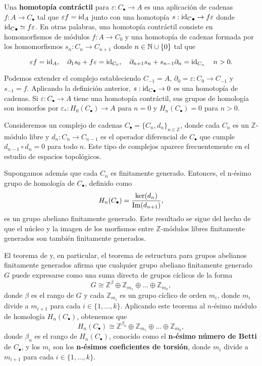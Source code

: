 \begin{definicion}
	\label{def:contr_homotopy} Una \textbf{homotopía contráctil} para
	\(\varepsilon: C_{\bullet}\to A\) es una aplicación de cadenas
	\(f: A \to C_{\bullet}\) tal que \(\varepsilon f = \operatorname{id}_{A}\) junto con una
	homotopía \(s:{\operatorname{id}_C}_{\bullet}\rightarrow f \varepsilon\) donde
	\({\operatorname{id}_C}_{\bullet}\simeq f \varepsilon\). En otras palabras, una homotopía
	contráctil consiste en homomorfismos de módulos \(f: A \to C_{0}\) y una homotopía de cadenas formada por los homomorfismos 
	\(s_{n}: C_{n}\to C_{n+1} \) donde $n \in \mathbb{N} \cup \{0\}$ tal que
	
	\[
	\varepsilon f = \operatorname{id}_{A}, \quad \partial_{1}s_{0}+ f \varepsilon = \operatorname{id}_{C_0},
	\quad \partial_{n+1}s_{n}+ s_{n-1}\partial_{n}= \operatorname{id}_{C_n}\quad n > 0.
	\]
\end{definicion}

Podemos extender el complejo estableciendo \(C_{-1}= A\), \(\partial_{0}= \varepsilon
: C_{0}\to C_{-1}\) y \(s_{-1}= f\). Aplicando la definición anterior, \(s:{\operatorname{id}_C}
_{\bullet}\rightarrow 0\) es una homotopía de cadenas. Si
\(\varepsilon: C_{\bullet}\to A\) tiene una homotopía contráctil, sus grupos de homología
son isomorfos por \(\varepsilon_{*}: H_{0}(C_{\bullet}) \rightarrow A\) para \(n = 0\)
y \(H_{n}(C_{\bullet}) = 0\) para \(n > 0\).

Consideremos un complejo de cadenas \(C_{\bullet}= \{ C_{n}, d_{n}\}_{n \in
	\mathbb{Z}}\), donde cada \(C_{n}\) es un \(\mathbb{Z}\)-módulo libre y
\(d_{n}: C_{n}\to C_{n-1}\) es el operador diferencial de \(C_{\bullet}\) que cumple
\(d_{n-1}\circ d_{n}= 0\) para todo \(n\). Este tipo de complejos aparece frecuentemente
en el estudio de espacios topológicos.

Supongamos además que cada \(C_{n}\) es finitamente generado. Entonces, el n-ésimo
grupo de homología de \(C_{\bullet}\), definido como
\[
H_{n}(C_{\bullet}) = \frac{\ker(d_{n})}{\operatorname{Im}(d_{n+1})},
\]
es un grupo abeliano finitamente generado. Este resultado se sigue del hecho de que
el núcleo y la imagen de los morfismos entre \(\mathbb{Z}\)-módulos libres finitamente
generados son también finitamente generados.

El teorema de  y, en particular, el teorema de
estructura para grupos abelianos finitamente generados afirma que cualquier
grupo abeliano finitamente generado \(G\) puede expresarse como una suma directa
de grupos cíclicos de la forma
\[
G \cong \mathbb{Z}^{\beta}\oplus \mathbb{Z}_{m_1}\oplus \ldots \oplus \mathbb{Z}
_{m_k},
\]
donde \(\beta\) es el rango de \(G\) y cada \(\mathbb{Z}_{m_i}\) es un grupo cíclico
de orden \(m_{i}\), donde \(m_{i}\) divide a \(m_{i+1}\) para cada \(i \in \{1, \ldots,
k\}\). Aplicando este teorema al $n$-ésimo módulo de homología \(H_{n}(C_{\bullet})\),
obtenemos que
\[
H_{n}(C_{\bullet}) \cong \mathbb{Z}^{\beta_n}\oplus \mathbb{Z}_{m_1}\oplus \ldots
\oplus \mathbb{Z}_{m_k},
\]
donde \(\beta_{n}\) es el rango de \(H_{n}(C_{\bullet})\), conocido como el \textbf{n-ésimo
	número de Betti} de \(C_{\bullet}\), y los \(m_{i}\) son los \textbf{n-ésimos
	coeficientes de torsión}, donde \(m_{i}\) divide a \(m_{i+1}\) para cada
\(i \in \{1, \ldots, k\}\).

